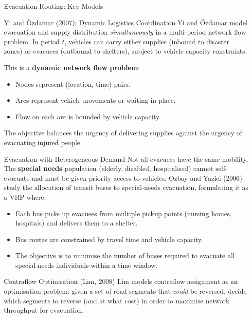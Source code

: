 \documentclass[aspectratio=169,10pt]{beamer}
\begin{document}
\begin{frame}[allowframebreaks]{Evacuation Routing: Key Models}
  \begin{block}{Yi and \"{O}zdamar (2007): Dynamic Logistics Coordination}
    Yi and \"{O}zdamar model evacuation and supply distribution
    \emph{simultaneously} in a multi-period network flow problem.
    In period $t$, vehicles can carry either supplies (inbound to
    disaster zones) or evacuees (outbound to shelters), subject to
    vehicle capacity constraints.

    This is a \textbf{dynamic network flow problem}:
    \begin{itemize}
      \item Nodes represent (location, time) pairs.
      \item Arcs represent vehicle movements or waiting in place.
      \item Flow on each arc is bounded by vehicle capacity.
    \end{itemize}
    The objective balances the urgency of delivering supplies against
    the urgency of evacuating injured people.
  \end{block}

  \medskip
  \begin{block}{Evacuation with Heterogeneous Demand}
    Not all evacuees have the same mobility.
    The \textbf{special needs} population (elderly, disabled, hospitalised)
    cannot self-evacuate and must be given priority access to vehicles.
    Ozbay and Yazici (2006) study the allocation of transit buses
    to special-needs evacuation, formulating it as a VRP where:
    \begin{itemize}
      \item Each bus picks up evacuees from multiple pickup points
            (nursing homes, hospitals) and delivers them to a shelter.
      \item Bus routes are constrained by travel time and vehicle capacity.
      \item The objective is to minimise the number of buses required
            to evacuate all special-needs individuals within
            a time window.
    \end{itemize}
  \end{block}

  \framebreak

  \begin{block}{Contraflow Optimisation (Lim, 2008)}
    Lim models contraflow assignment as an optimisation problem:
    given a set of road segments that \emph{could} be reversed, decide
    which segments to reverse (and at what cost) in order to maximise
    network throughput for evacuation.


\end{block}
\end{frame}
\end{document}

